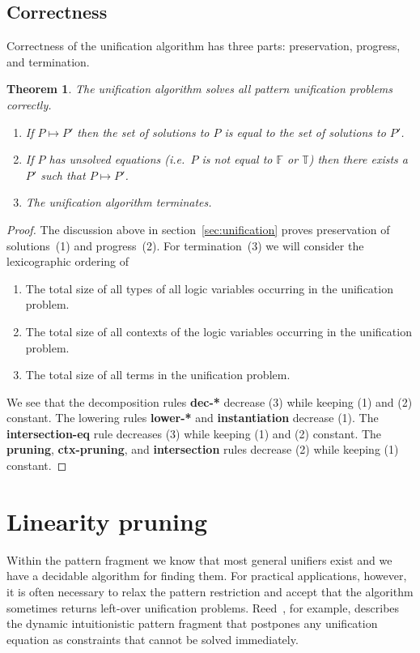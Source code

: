 \documentclass{eptcs}
\newtheorem{thm}{Theorem}[section]
\theoremstyle{definition}
\begin{document}
\subsection{Correctness}
Correctness of the unification algorithm has three parts: preservation,
progress, and termination.
\begin{thm}\label{thm:unif-correct}
The unification algorithm solves all pattern unification problems
correctly.
\begin{enumerate}
\item
If $P\mapsto P'$ then the set of solutions to $P$ is equal to the set of
solutions to $P'$.
\item
If $P$ has unsolved equations (i.e.\ $P$ is not equal to $\mathbb{F}$ or
$\mathbb{T}$) then there exists a $P'$ such that $P\mapsto P'$.
\item
The unification algorithm terminates.
\end{enumerate}
\end{thm}
\begin{proof}
The discussion above in section~\ref{sec:unification}
proves preservation of solutions~(1) and progress~(2).
For termination~(3) we will consider the lexicographic ordering of
\begin{enumerate}
\item
The total size of all types of all logic variables occurring in the
unification problem.
\item
The total size of all contexts of the logic variables occurring in the
unification problem.
\item
The total size of all terms in the unification problem.
\end{enumerate}
We see that the decomposition rules \textbf{dec-*} decrease (3) while
keeping (1) and (2) constant.  The lowering rules \textbf{lower-*} and
\textbf{instantiation} decrease (1).  The \textbf{intersection-eq} rule decreases
(3) while keeping (1) and (2) constant.  The \textbf{pruning},
\textbf{ctx-pruning}, and
\textbf{intersection} rules decrease (2) while keeping (1) constant.
\end{proof}

\section{Linearity  pruning}
Within the pattern fragment we know that most general unifiers exist
and we have a decidable algorithm for finding them.  For practical
applications, however, it is often necessary to relax the pattern
restriction and accept that the algorithm sometimes returns left-over
unification problems.  Reed~\cite{Reed09lfmtp}, for example, describes
the dynamic intuitionistic pattern fragment that postpones any
unification equation as constraints that cannot be solved immediately.
\end{document}
